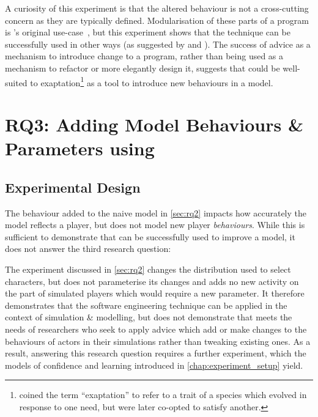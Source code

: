 A curiosity of this experiment is that the altered behaviour is not a
cross-cutting concern as they are typically defined. Modularisation of these
parts of a program is \aop{}'s original use-case~\cite{kiczales1997aspect}, but
this experiment shows that the technique can be successfully used in other ways
(as suggested by \citet{gulyas1999use} and \citet{steimann06paradoxical}). The
success of advice as a mechanism to introduce change to a program, rather than
being used as a mechanism to refactor or more elegantly design it, suggests that
\aop{} could be well-suited to exaptation\footnote{\citet{exaptation_origin}
coined the term ``exaptation'' to refer to a trait of a species which evolved in
response to one need, but were later co-opted to satisfy another.} as a tool to
introduce new behaviours in a model.



\section{RQ3: Adding Model Behaviours \& Parameters using \AspectOrientation}
\label{sec:rq3}

\subsection{Experimental Design}

The behaviour added to the naive model in \cref{sec:rq2} impacts how accurately
the model reflects a player, but does not model new player \emph{behaviours}.
While this is sufficient to demonstrate that \aop{} can be successfully used to
improve a model, it does not answer the third research question:

\begin{researchquestion}
\rqthree{}
\end{researchquestion}


The experiment discussed in \cref{sec:rq2} changes the distribution used to
select characters, but does not parameterise its changes and adds no new
activity on the part of simulated players which would require a new parameter.
It therefore demonstrates that the software engineering technique can be applied
in the context of simulation \& modelling, but does not demonstrate that \aop
meets the needs of researchers who seek to apply advice which add or make changes to
the behaviours of actors in their simulations rather than tweaking existing
ones. As a result, answering this research question requires a further
experiment, which the \aspectoriented models of confidence and learning
introduced in \cref{chap:experiment_setup} yield.

